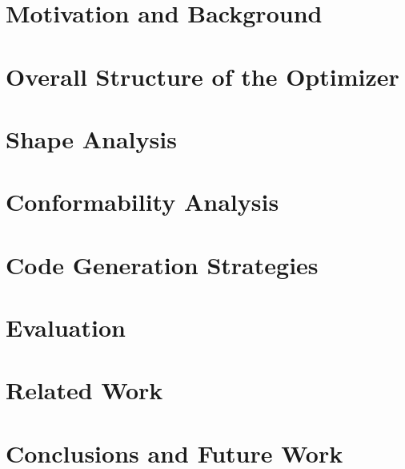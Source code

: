 \documentclass[sigplan,screen,10pt]{acmart}\settopmatter{}
\begin{document}
\section{Motivation and Background} \label{Sec:background}


\section{Overall Structure of the Optimizer} \label{Sec:overview}


\section{Shape Analysis} \label{Sec:shape}


\section{Conformability Analysis} \label{Sec:conformability}


\section{Code Generation Strategies} \label{Sec:codegen}


\section{Evaluation} \label{Sec:evaluation}


\vspace{-1mm}
\section{Related Work} \label{Sec:relatedwork}


\vspace{-1mm}
\section{Conclusions and Future Work} \label{Sec:conclusion}


\end{document}
